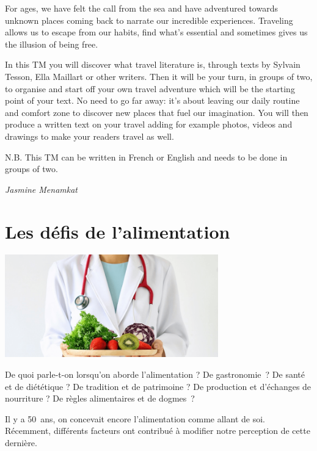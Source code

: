 \documentclass[
  10pt,
  french,
  a5paper,
  openany]{book}
\newenvironment{signature}{\begin{flushright}}{\end{flushright}}
\begin{document}
For ages, we have felt the call from the sea and have adventured towards unknown places coming back to narrate our incredible experiences. Traveling allows us to escape from our habits, find what's essential and sometimes gives us the illusion of being free.

In this TM you will discover what travel literature is, through texts by Sylvain Tesson, Ella Maillart or other writers. Then it will be your turn, in groups of two, to organise and start off your own travel adventure which will be the starting point of your text. No need to go far away: it's about leaving our daily routine and comfort zone to discover new places that fuel our imagination. You will then produce a written text on your travel adding for example photos, videos and drawings to make your readers travel as well.

N.B. This TM can be written in French or English and needs to be done in groups of two.

\begin{signature}
\emph{Jasmine Menamkat}

\end{signature}

\hypertarget{les-duxe9fis-de-lalimentation}{%
\chapter{Les défis de l'alimentation}\label{les-duxe9fis-de-lalimentation}}

\begin{center}
\includegraphics[width=\textwidth,height=12em]{images/les-defis-de-lalimentation.png}

\end{center}

De quoi parle-t-on lorsqu'on aborde l'alimentation ? De gastronomie~? De santé et de diététique ? De tradition et de patrimoine ? De production et d'échanges de nourriture ? De règles alimentaires et de dogmes~?

Il y a 50~ans, on concevait encore l'alimentation comme allant de soi. Récemment, différents facteurs ont contribué à modifier notre perception de cette dernière.
\end{document}
